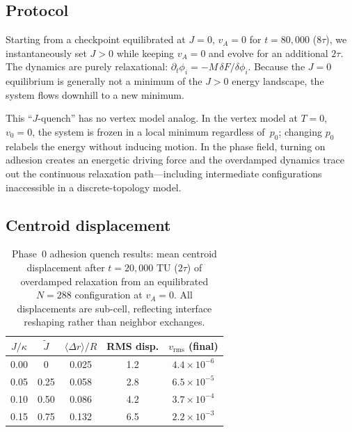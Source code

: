 \documentclass[aps,pre,twocolumn,superscriptaddress,longbibliography,floatfix]{revtex4-2}
\newcommand{\vA}{v_{\!A}}                  %
\newcommand{\Jt}{\tilde{J}}               %
\newcommand{\phii}{\phi_i}                 %
\begin{document}
\subsection{Protocol}
\label{sec:quench:protocol}

Starting from a checkpoint equilibrated at $J = 0$, $\vA = 0$ for
$t = 80{,}000$ ($8\tau$), we instantaneously set $J > 0$ while keeping
$\vA = 0$ and evolve for an additional $2\tau$.  The dynamics are
purely relaxational: $\partial_t \phii = -M\,\delta F/\delta\phii$.
Because the $J = 0$ equilibrium is generally not a minimum of the
$J > 0$ energy landscape, the system flows downhill to a new minimum.

This ``$J$-quench'' has no vertex model analog.  In the vertex model at
$T = 0$, $v_0 = 0$, the system is frozen in a local minimum regardless
of~$p_0$; changing $p_0$ relabels the energy without inducing motion.
In the phase field, turning on adhesion creates an energetic driving
force and the overdamped dynamics trace out the continuous
relaxation path---including intermediate configurations inaccessible in
a discrete-topology model.

\subsection{Centroid displacement}
\label{sec:quench:displacement}

\begin{table}[b]
\caption{Phase~0 adhesion quench results: mean centroid displacement
  after $t = 20{,}000$ TU ($2\tau$) of overdamped relaxation from an
  equilibrated $N = 288$ configuration at $\vA = 0$.  All displacements
  are sub-cell, reflecting interface reshaping rather than neighbor
  exchanges.}
\label{tab:quench}
\begin{ruledtabular}
\begin{tabular}{ccccc}
$J/\kappa$ & $\Jt$ & $\langle\Delta r\rangle / R$ & RMS disp. & $v_{\mathrm{rms}}$ (final) \\
\midrule
0.00 & 0    & 0.025 & 1.2 & $4.4\times10^{-6}$ \\
0.05 & 0.25 & 0.058 & 2.8 & $6.5\times10^{-5}$ \\
0.10 & 0.50 & 0.086 & 4.2 & $3.7\times10^{-4}$ \\
0.15 & 0.75 & 0.132 & 6.5 & $2.2\times10^{-3}$ \\
\end{tabular}
\end{ruledtabular}
\end{table}
\end{document}

